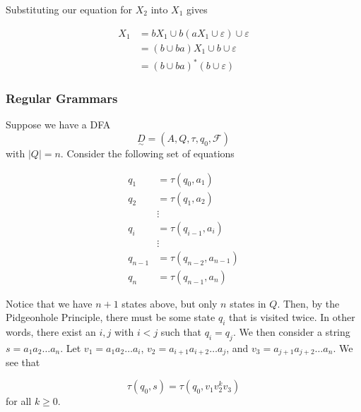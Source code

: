 Substituting our equation for $X_2$ into $X_1$ gives 

\begin{align*}
      X_1&=bX_1\cup b(aX_1\cup\varepsilon)\cup\varepsilon\\
         &=(b\cup ba)X_1\cup b\cup\varepsilon\\
         &=(b\cup ba)^*(b\cup\varepsilon)
\end{align*}

\subsubsection{Regular Grammars}

Suppose we have a DFA \[\underset{\sim}{D}=(A, Q, \tau, q_0, \mathcal{F})\] with $|Q|=n$. Consider the following set of equations

\begin{align*}
      q_1 &= \tau(q_0, a_1)\\
      q_2 &= \tau(q_1, a_2)\\
          &\vdots\\
      q_i &= \tau(q_{i-1}, a_i)\\
          &\vdots\\
      q_{n-1} &= \tau(q_{n-2}, a_{n-1})\\
      q_n &= \tau(q_{n-1}, a_n)
\end{align*}

Notice that we have $n+1$ states above, but only $n$ states in $Q$. Then, by the Pidgeonhole Principle, there must be some state $q_i$ that is visited twice. In other words, there exist an $i, j$ with $i < j$ such that $q_i=q_j$. We then consider a string $s=a_1a_2\hdots a_n$. Let $v_1=a_1a_2\hdots a_i$, $v_2=a_{i+1}a_{i+2}\hdots a_j$, and $v_3=a_{j+1}a_{j+2}\hdots a_n$. We see that 

\[\tau(q_0, s)=\tau(q_0, v_1v_2^kv_3)\] for all $k\geq0$. 

\begin{center}\end{center}